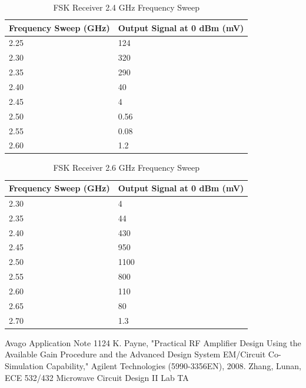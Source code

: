 \documentclass[conference]{IEEEtran}
\begin{document}
\begin{table}
\caption{FSK Receiver 2.4 GHz Frequency Sweep}
    \begin{tabular}{|l|l|}
    \hline
    Frequency Sweep (GHz) & Output Signal at 0 dBm (mV) \\\hline
    2.25                  & 124                         \\\hline
    2.30                  & 320                         \\\hline
    2.35                  & 290                         \\\hline
    2.40                  & 40                          \\\hline
    2.45                  & 4                           \\\hline
    2.50                  & 0.56                        \\\hline
    2.55                  & 0.08                        \\\hline
    2.60                  & 1.2                         \\\hline
    \end{tabular}
\label{tab:fsk24}
\end{table}

\begin{table}
\caption{FSK Receiver 2.6 GHz Frequency Sweep}
    \begin{tabular}{|l|l|}
    \hline
    Frequency Sweep (GHz) & Output Signal at 0 dBm (mV) \\ \hline
    2.30                  & 4                           \\ \hline
    2.35                  & 44                          \\ \hline
    2.40                  & 430                         \\ \hline
    2.45                  & 950                         \\ \hline
    2.50                  & 1100                        \\ \hline
    2.55                  & 800                         \\\hline
    2.60                  & 110                         \\ \hline
    2.65                  & 80                          \\\hline
    2.70                  & 1.3                         \\\hline
    \end{tabular}
\label{tab:fsk26}
\end{table}

\begin{thebibliography}{1}
Avago Application Note 1124
K. Payne, "Practical RF Amplifier Design Using the Available Gain Procedure and the Advanced Design System EM/Circuit Co-Simulation Capability," Agilent Technologies (5990-3356EN), 2008.
Zhang, Lunan, ECE 532/432 Microwave Circuit Design II Lab TA
\end{thebibliography}
\end{document}
